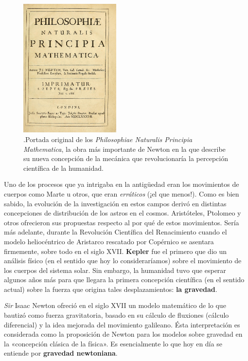 \documentclass[11pt,a4paper,titlepage]{article}
\begin{document}
\begin{figure}
	\centering
	\includegraphics[width=0.45\textwidth]{newton}
	\caption{\cite{newtonbib}.Portada original de los \textit{Philosophiae Naturalis Principia Mathematica}, la obra más importante de Newton en la que describe su nueva concepción de la mecánica que revolucionaría la percepción científica de la humanidad.}
	\label{fig:newton}
\end{figure}

Uno de los procesos que ya intrigaba en la antigüedad eran los movimientos de cuerpos como Marte u otros, que eran \textit{erráticos} (¡el que menos!). Como es bien sabido, la evolución de la investigación en estos campos derivó en distintas concepciones de distribución de los astros en el cosmos. Aristóteles, Ptolomeo y otros ofrecieron sus propuestas respecto al por qué de estos movimientos. Sería más adelante, durante la Revolución Científica del Renacimiento cuando el modelo heliocéntrico de Aristarco rescatado por Copérnico se asentara firmemente, sobre todo en el siglo XVII. \textbf{Kepler} fue el primero que dio un análisis físico (en el sentido que hoy lo consideraríamos) sobre el movimiento de los cuerpos del sistema solar. Sin embargo, la humanidad tuvo que esperar algunos años más para que llegara la primera concepción científica (en el sentido actual) sobre la fuerza que origina tales desplazamientos: \textbf{la gravedad}.

\textit{Sir} Isaac Newton ofreció en el siglo XVII un modelo matemático de lo que bautizó como fuerza gravitatoria, basado en su cálculo de fluxiones (cálculo diferencial) y la idea mejorada del movimiento galileano. Ésta interpretación es considerada como la proposición de Newton para los modelos sobre gravedad en la «concepción clásica de la física». Es esencialmente lo que hoy en día se entiende por \textbf{gravedad newtoniana}.
\end{document}
